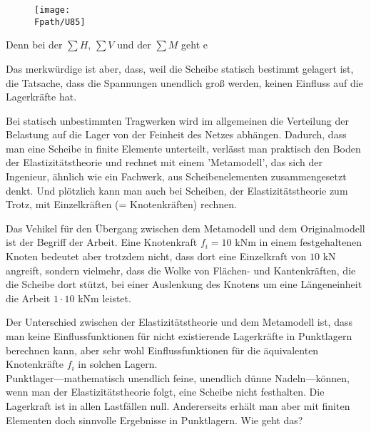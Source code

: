 {%
\begin{figure}[tbp]
\centering
\texttt{[image: \\Fpath/U85]}
%
\end{figure}%

Denn bei der $\sum H$, $\sum V$ und der $\sum M$ geht e

Das merkw\"{u}rdige ist aber, dass, weil die Scheibe statisch bestimmt gelagert ist, die Tatsache, dass die Spannungen unendlich gro{\ss} werden, keinen Einfluss auf die Lagerkr\"{a}fte hat.

Bei statisch unbestimmten Tragwerken wird im allgemeinen die Verteilung der Belastung auf die Lager von der Feinheit des Netzes abh\"{a}ngen.
Dadurch, dass man eine Scheibe in finite Elemente unterteilt, verl\"{a}sst man praktisch den Boden der Elastizit\"{a}tstheorie und rechnet mit einem
'Metamodell', das sich der Ingenieur, \"{a}hnlich wie ein Fachwerk, aus Scheibenelementen zusammengesetzt denkt. Und pl\"{o}tzlich kann man auch bei Scheiben, der Elastizit\"{a}tstheorie zum Trotz, mit Einzelkr\"{a}ften (= Knotenkr\"{a}ften) rechnen.

Das Vehikel f\"{u}r den \"{U}bergang zwischen dem Metamodell und dem Originalmodell ist der Begriff der Arbeit. Eine Knotenkraft $f_i = 10 $ kNm in einem festgehaltenen Knoten bedeutet aber trotzdem nicht, dass dort eine Einzelkraft von $10$ kN angreift, sondern vielmehr, dass die Wolke von Fl\"{a}chen- und Kantenkr\"{a}ften, die die Scheibe dort st\"{u}tzt, bei einer Auslenkung des Knotens um eine L\"{a}ngeneinheit die Arbeit $1 \cdot 10$ kNm leistet.



Der Unterschied zwischen der Elastizit\"{a}tstheorie und dem Metamodell ist, dass man keine Einflussfunktionen f\"{u}r nicht existierende Lagerkr\"{a}fte in Punktlagern berechnen kann, aber sehr wohl Einflussfunktionen f\"{u}r die \"{a}quivalenten Knotenkr\"{a}fte $f_i$ in solchen Lagern.
\\

Punktlager---mathematisch unendlich feine, unendlich d\"{u}nne Nadeln---k\"{o}nnen, wenn man der Elastizit\"{a}tstheorie folgt, eine Scheibe nicht festhalten.   Die Lagerkraft ist in allen Lastf\"{a}llen null.
Andererseits erh\"{a}lt man aber mit finiten Elementen doch sinnvolle Ergebnisse in Punktlagern. Wie geht das?

}
